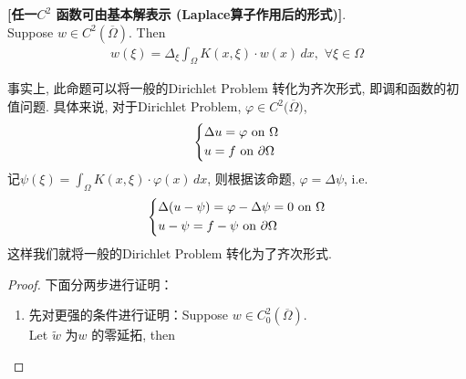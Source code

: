 	\begin{proposition}\label{prop 3.3.2}
		\textbf{[任一$C^2$ 函数可由基本解表示 (Laplace算子作用后的形式)]}. \\
		Suppose $w \in C^2 \left( \overline{\Omega} \right)$. Then
		\begin{align*}
			w(\xi) 
			= \Delta_{\xi} \int_{\Omega} K(x , \xi) \cdot w(x) \, dx , \,\, \forall \xi \in \Omega
		\end{align*}
	
		\vspace{2em}
		
		\begin{rmk}
			事实上, 此命题可以将一般的Dirichlet Problem 转化为齐次形式, 即调和函数的初值问题. 具体来说, 对于Dirichlet Problem, $\varphi \in C^2\Big( \overline{\Omega} \Big)$, 
			\begin{align*}
				\begin{dcases*}
					\Delta u = \varphi \,\, \text{on} \,\, \Omega \\
					u = f \,\, \text{on} \,\, \partial \Omega
				\end{dcases*}
			\end{align*}
			记$\psi(\xi) = \int_{\Omega} K(x , \xi) \cdot \varphi(x) \, dx$, 则根据该命题, $\varphi = \Delta \psi$, i.e.
			\begin{align*}
				\begin{dcases*}
					\Delta(u - \psi) = \varphi - \Delta \psi = 0 \,\, \text{on} \,\, \Omega \\
					u - \psi = f - \psi \,\, \text{on} \,\, \partial \Omega
				\end{dcases*}
			\end{align*}
			这样我们就将一般的Dirichlet Problem 转化为了齐次形式. 
		\end{rmk}
		
		\vspace*{4em}
		
		\begin{proof}
			下面分两步进行证明：
			\begin{enumerate}
				\item 先对更强的条件进行证明：Suppose $w \in C_{0}^2 \left( \overline{\Omega} \right)$. \\
				Let $\widetilde{w}$ 为$w$ 的零延拓, then 
				
				\newpage
				

\end{enumerate}
\end{proof}
\end{proposition}

